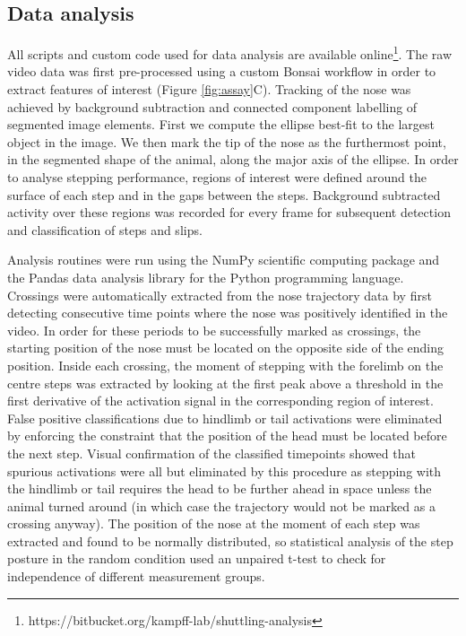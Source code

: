\subsection{Data analysis}

All scripts and custom code used for data analysis are available online\footnote{https://bitbucket.org/kampff-lab/shuttling-analysis}. The raw video data was first pre-processed using a custom Bonsai workflow in order to extract features of interest (Figure \ref{fig:assay}C). Tracking of the nose was achieved by background subtraction and connected component labelling of segmented image elements. First we compute the ellipse best-fit to the largest object in the image. We then mark the tip of the nose as the furthermost point, in the segmented shape of the animal, along the major axis of the ellipse. In order to analyse stepping performance, regions of interest were defined around the surface of each step and in the gaps between the steps. Background subtracted activity over these regions was recorded for every frame for subsequent detection and classification of steps and slips.

Analysis routines were run using the NumPy scientific computing package \citep{Walt2011} and the Pandas data analysis library \citep{McKinney2010} for the Python programming language. Crossings were automatically extracted from the nose trajectory data by first detecting consecutive time points where the nose was positively identified in the video. In order for these periods to be successfully marked as crossings, the starting position of the nose must be located on the opposite side of the ending position. Inside each crossing, the moment of stepping with the forelimb on the centre steps was extracted by looking at the first peak above a threshold in the first derivative of the activation signal in the corresponding region of interest. False positive classifications due to hindlimb or tail activations were eliminated by enforcing the constraint that the position of the head must be located before the next step. Visual confirmation of the classified timepoints showed that spurious activations were all but eliminated by this procedure as stepping with the hindlimb or tail requires the head to be further ahead in space unless the animal turned around (in which case the trajectory would not be marked as a crossing anyway). The position of the nose at the moment of each step was extracted and found to be normally distributed, so statistical analysis of the step posture in the random condition used an unpaired t-test to check for independence of different measurement groups.

